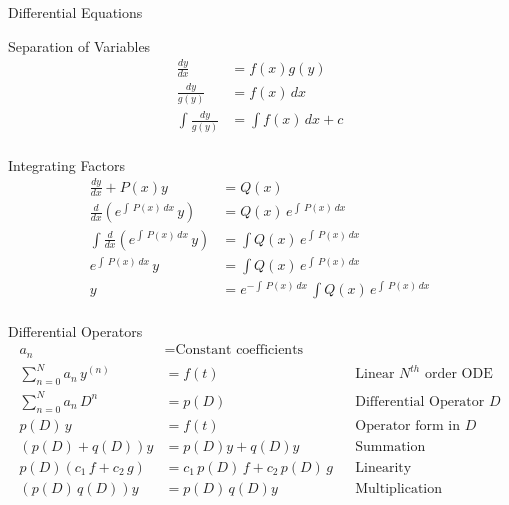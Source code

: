 %
%

\begin{section}{Differential Equations}

  \begin{subsection}{Separation of Variables}
    \begin{align*}
      \frac{dy}{dx} &= f(x)g(y) \\
      \frac{dy}{g(y)} &= f(x)\,dx \\
      \int{\frac{dy}{g(y)}} &= \int{f(x)}\,dx+c \\
    \end{align*}
  \end{subsection}
  \begin{subsection}{Integrating Factors}
    \begin{align*}
      \frac{dy}{dx} + P(x)y &= Q(x) \\
      \frac{d}{dx}(e^{\int\,P(x)\,dx}\,y) &= Q(x)\,e^{\int\,P(x)\,dx} \\
      \int{\frac{d}{dx}(e^{\int\,P(x)\,dx}\,y)} &= \int{Q(x)\,e^{\int\,P(x)\,dx}} \\
      e^{\int\,P(x)\,dx}\,y &= \int{Q(x)\,e^{\int\,P(x)\,dx}} \\
      y &= e^{-\int\,P(x)\,dx}\,\int{Q(x)\,e^{\int\,P(x)\,dx}} \\
    \end{align*}
  \end{subsection}
  \begin{subsection}{Differential Operators}
    \begin{align*}
      a_n &= \text{Constant coefficients} \\
      \sum_{n=0}^{N} a_n\,y^{(n)} &= f(t) && \text{Linear $N^{th}$ order ODE} \\
      \sum_{n=0}^{N} a_n\,D^{n} &= p(D) && \text{Differential Operator $D$} \\
      p(D)\,y &= f(t) && \text{Operator form in $D$} \\
      (p(D) + q(D))y &= p(D)y + q(D)y && \text{Summation} \\
      p(D)(c_1\,f + c_2\,g) &=
      c_1\,p(D)\,f +  c_2\,p(D)\,g && \text{Linearity} \\
      (p(D)\,q(D))y &= p(D)\,q(D)y && \text{Multiplication} \\

\end{align*}
\end{subsection}
\end{section}
